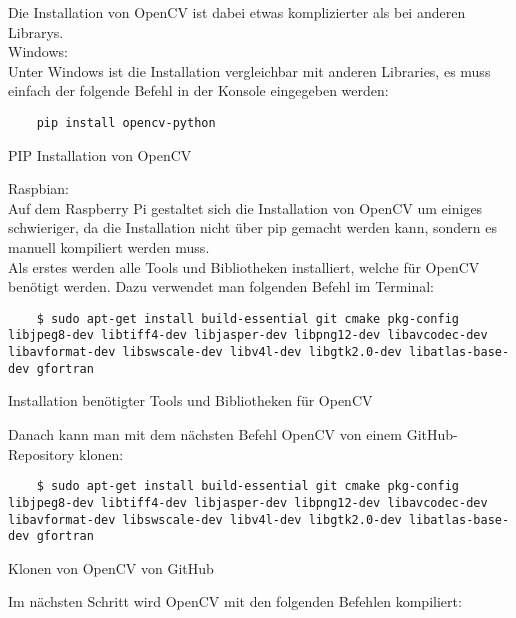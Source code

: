 Die Installation von OpenCV ist dabei etwas komplizierter als bei anderen Librarys.\\

Windows:\\

Unter Windows ist die Installation vergleichbar mit anderen Libraries, es muss einfach der folgende Befehl in der Konsole eingegeben werden:

\begin{listing}[H]
    \begin{verbatim}
    pip install opencv-python
    \end{verbatim}
    \caption{PIP Installation von OpenCV}
\end{listing}

Raspbian:\\

Auf dem Raspberry Pi gestaltet sich die Installation von OpenCV um einiges schwieriger, da die Installation nicht über pip gemacht werden kann, 
sondern es manuell kompiliert werden muss.\\

Als erstes werden alle Tools und Bibliotheken installiert, welche für OpenCV benötigt werden. Dazu verwendet man folgenden Befehl im Terminal:

\begin{listing}[H]
    \begin{verbatim}
    $ sudo apt-get install build-essential git cmake pkg-config libjpeg8-dev libtiff4-dev libjasper-dev libpng12-dev libavcodec-dev libavformat-dev libswscale-dev libv4l-dev libgtk2.0-dev libatlas-base-dev gfortran
    \end{verbatim}
    \caption{Installation benötigter Tools und Bibliotheken für OpenCV}
\end{listing}

Danach kann man mit dem nächsten Befehl OpenCV von einem GitHub-Repository klonen:

\begin{listing}[H]
    \begin{verbatim}
    $ sudo apt-get install build-essential git cmake pkg-config libjpeg8-dev libtiff4-dev libjasper-dev libpng12-dev libavcodec-dev libavformat-dev libswscale-dev libv4l-dev libgtk2.0-dev libatlas-base-dev gfortran
    \end{verbatim}
    \caption{Klonen von OpenCV von GitHub}
\end{listing}

Im nächsten Schritt wird OpenCV mit den folgenden Befehlen kompiliert:

